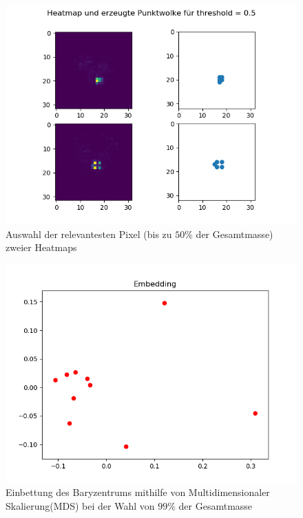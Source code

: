 \documentclass[11pt,a4paper]{article}
\numberwithin{equation}{section}
\begin{document}
	\begin{figure}[h]
		\begin{center}
			\includegraphics[width=0.5\textheight]{HeatmapPunktwolke50.png}
			\caption{Auswahl der relevantesten Pixel (bis zu $50\%$ der Gesamtmasse) zweier Heatmaps}
		\end{center}
	\end{figure}
	
	\begin{figure}[h]
		\begin{center}
			\includegraphics[width=0.5\textheight]{bary_embedding99.png}
			\caption{Einbettung des Baryzentrums mithilfe von Multidimensionaler Skalierung(MDS) bei der Wahl von $99\%$ der Gesamtmasse}
		\end{center}
	\end{figure}
	
\end{document}
